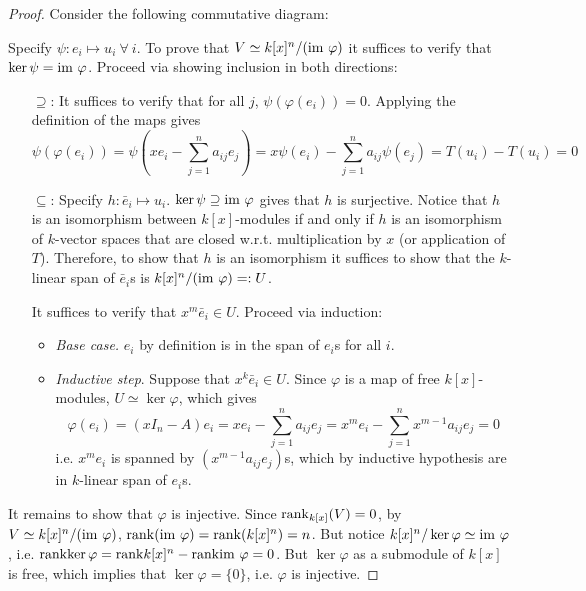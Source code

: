 \documentclass{article}
\begin{document}
\begin{proof}
    Consider the following commutative diagram:
    \clearpage
    \begin{figure}[htbp]
        \centering
    \end{figure}
    Specify $\psi: e_i \mapsto u_i \ \forall\ i$. To prove that $V \simeq k[x]^n / (\mathrm{im}\  \varphi)$ it suffices to verify that $\ker \psi = \mathrm{im}\  \varphi$. Proceed via showing inclusion in both directions:
    \begin{itemize}
        \item[$\supseteq$:] It suffices to verify that for all $j$, $\psi(\varphi(e_i)) = 0$. Applying the definition of the maps gives
        \[
            \psi(\varphi(e_i)) = \psi(xe_i - \sum\limits_{j=1}^n a_{ij} e_j) = x\psi(e_i) - \sum\limits_{j=1}^n a_{ij} \psi(e_j) = T(u_i) - T(u_i) = 0
        \]
        \item[$\subseteq$:] Specify $h: \bar{e}_i \mapsto u_i$. $\ker\psi \supseteq \mathrm{im}\  \varphi$ gives that $h$ is surjective. Notice that $h$ is an isomorphism between $k[x]$-modules if and only if $h$ is an isomorphism of $k$-vector spaces that are closed w.r.t. multiplication by $x$ (or application of $T$). Therefore, to show that $h$ is an isomorphism it suffices to show that the $k$-linear span of $\bar{e}_i$s is $k[x]^n / (\mathrm{im}\  \varphi) =: U$. 
        
        It suffices to verify that $x^m \bar{e}_i \in U$. Proceed via induction:
        \begin{itemize}
            \item \emph{Base case.} $e_i$ by definition is in the span of $e_i$s for all $i$. 
            \item \emph{Inductive step}. Suppose that $x^k \bar{e}_i \in U$. Since $\varphi$ is a map of free $k[x]$-modules, $U \simeq \ker \varphi$, which gives 
            \[
                \varphi(e_i) = (xI_n - A) e_i = xe_i - \sum_{j=1}^n a_{ij} e_j = x^m e_i - \sum_{j=1}^n x^{m-1} a_{ij} e_j = 0
            \]
            i.e. $x^m e_i$ is spanned by $(x^{m-1} a_{ij} e_j)$s, which by inductive hypothesis are in $k$-linear span of $e_i$s.
        \end{itemize}
    \end{itemize}
    It remains to show that $\varphi$ is injective. Since $\mathrm{rank}_{k[x]}(V) = 0$, by $V \simeq k[x]^n / (\mathrm{im}\  \varphi)$, $\mathrm{rank}(\mathrm{im}\ \varphi) = \mathrm{rank}(k[x]^n) = n$. But notice $k[x]^n / \ker \varphi \simeq \mathrm{im}\  \varphi$, i.e. $\mathrm{rank}{\ker \varphi} = \mathrm{rank}{k[x]^n} - \mathrm{rank}{\mathrm{im}\  \varphi} = 0$. But $\ker\varphi$ as a submodule of $k[x]$ is free, which implies that $\ker \varphi = \{0\}$, i.e. $\varphi$ is injective. 
\end{proof}
\end{document}
